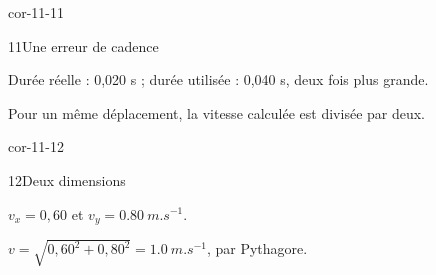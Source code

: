 \begin{blocLivre}{cor-11-11}\begin{corrige}{11}{Une erreur de cadence}
\begin{questions}
\item Durée réelle : 0,020 s ; durée utilisée : 0,040 s, deux fois plus grande.
\item Pour un même déplacement, la vitesse calculée est divisée par deux.
\end{questions}
\end{corrige}\end{blocLivre}
\begin{blocLivre}{cor-11-12}\begin{corrige}{12}{Deux dimensions}
\begin{questions}
\item $v_x=0,60$ et $v_y=\qty{0,80}{m.s^{-1}}$.
\item $v=\sqrt{0,60^2+0,80^2}=\qty{1,0}{m.s^{-1}}$, par Pythagore.
\end{questions}
\end{corrige}\end{blocLivre}

